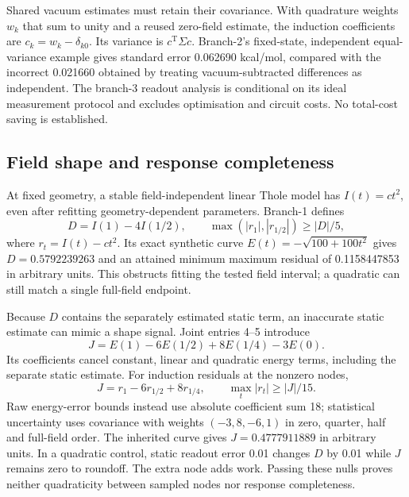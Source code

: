 \documentclass{article}
\begin{document}
Shared vacuum estimates must retain their covariance. With quadrature weights $w_k$ that sum to unity and a reused zero-field estimate, the induction coefficients are $c_k=w_k-\delta_{k0}$. Its variance is $c^{\mathrm T}\Sigma c$. Branch-2's fixed-state, independent equal-variance example gives standard error 0.062690 kcal/mol, compared with the incorrect 0.021660 obtained by treating vacuum-subtracted differences as independent. The branch-3 readout analysis is conditional on its ideal measurement protocol and excludes optimisation and circuit costs. No total-cost saving is established.

\subsection{Field shape and response completeness}

At fixed geometry, a stable field-independent linear Thole model has $I(t)=ct^2$, even after refitting geometry-dependent parameters. Branch-1 defines
\begin{equation*}
D=I(1)-4I(1/2),\qquad
\max(|r_1|,|r_{1/2}|)\geq |D|/5,
\end{equation*}
where $r_t=I(t)-ct^2$. Its exact synthetic curve $E(t)=-\sqrt{100+100t^2}$ gives $D=0.5792239263$ and an attained minimum maximum residual of 0.1158447853 in arbitrary units. This obstructs fitting the tested field interval; a quadratic can still match a single full-field endpoint.

Because $D$ contains the separately estimated static term, an inaccurate static estimate can mimic a shape signal. Joint entries 4--5 introduce
\begin{equation*}
J=E(1)-6E(1/2)+8E(1/4)-3E(0).
\end{equation*}
Its coefficients cancel constant, linear and quadratic energy terms, including the separate static estimate. For induction residuals at the nonzero nodes,
\begin{equation*}
J=r_1-6r_{1/2}+8r_{1/4},\qquad \max_t|r_t|\geq |J|/15.
\end{equation*}
Raw energy-error bounds instead use absolute coefficient sum 18; statistical uncertainty uses covariance with weights $(-3,8,-6,1)$ in zero, quarter, half and full-field order. The inherited curve gives $J=0.4777911889$ in arbitrary units. In a quadratic control, static readout error 0.01 changes $D$ by 0.01 while $J$ remains zero to roundoff. The extra node adds work. Passing these nulls proves neither quadraticity between sampled nodes nor response completeness.
\end{document}
